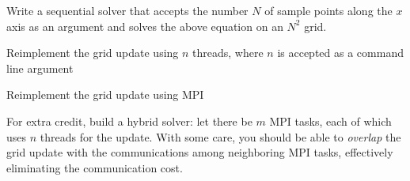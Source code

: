 \documentclass[12pt,answers]{exam}
\begin{document}
\begin{questions}

\question Write a sequential solver that accepts the number $N$ of sample points along the $x$ axis
as an argument and solves the above equation on an $N^{2}$ grid.

\question Reimplement the grid update using $n$ threads, where $n$ is accepted as a command line
argument

\question Reimplement the grid update using MPI

\question For extra credit, build a hybrid solver: let there be $m$ MPI tasks, each of which
uses $n$ threads for the update. With some care, you should be able to {\em overlap} the grid
update with the communications among neighboring MPI tasks, effectively eliminating the
communication cost.

\end{questions}
\end{document}
